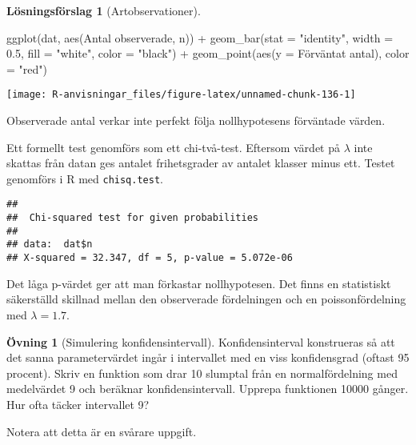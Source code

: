 \documentclass[
]{book}
\newenvironment{Shaded}{\begin{snugshade}}{\end{snugshade}}
\newcommand{\AttributeTok}[1]{\textcolor[rgb]{0.77,0.63,0.00}{#1}}
\newcommand{\FloatTok}[1]{\textcolor[rgb]{0.00,0.00,0.81}{#1}}
\newcommand{\FunctionTok}[1]{\textcolor[rgb]{0.00,0.00,0.00}{#1}}
\newcommand{\NormalTok}[1]{#1}
\newcommand{\SpecialCharTok}[1]{\textcolor[rgb]{0.00,0.00,0.00}{#1}}
\newcommand{\StringTok}[1]{\textcolor[rgb]{0.31,0.60,0.02}{#1}}
\theoremstyle{definition}
\theoremstyle{definition}
\theoremstyle{definition}
\newtheorem{exercise}{Övning}[chapter]
\theoremstyle{definition}
\newtheorem{hypothesis}{Lösningsförslag}[chapter]
\theoremstyle{remark}
\begin{document}
\begin{hypothesis}[Artobservationer]
\begin{Shaded}
\begin{Highlighting}[]
\FunctionTok{ggplot}\NormalTok{(dat, }\FunctionTok{aes}\NormalTok{(}\StringTok{\textasciigrave{}}\AttributeTok{Antal observerade}\StringTok{\textasciigrave{}}\NormalTok{, n)) }\SpecialCharTok{+}
  \FunctionTok{geom\_bar}\NormalTok{(}\AttributeTok{stat =} \StringTok{"identity"}\NormalTok{, }\AttributeTok{width =} \FloatTok{0.5}\NormalTok{, }
           \AttributeTok{fill =} \StringTok{"white"}\NormalTok{, }\AttributeTok{color =} \StringTok{"black"}\NormalTok{) }\SpecialCharTok{+}
  \FunctionTok{geom\_point}\NormalTok{(}\FunctionTok{aes}\NormalTok{(}\AttributeTok{y =} \StringTok{\textasciigrave{}}\AttributeTok{Förväntat antal}\StringTok{\textasciigrave{}}\NormalTok{), }\AttributeTok{color =} \StringTok{"red"}\NormalTok{)}
\end{Highlighting}
\end{Shaded}

\begin{center}\texttt{[image: R-anvisningar\_files/figure-latex/unnamed-chunk-136-1]} \end{center}

Observerade antal verkar inte perfekt följa nollhypotesens förväntade värden.

Ett formellt test genomförs som ett chi-två-test. Eftersom värdet på \(\lambda\) inte skattas från datan ges antalet frihetsgrader av antalet klasser minus ett. Testet genomförs i R med \texttt{chisq.test}.

\begin{Shaded}
\end{Shaded}

\begin{verbatim}
## 
##  Chi-squared test for given probabilities
## 
## data:  dat$n
## X-squared = 32.347, df = 5, p-value = 5.072e-06
\end{verbatim}

Det låga p-värdet ger att man förkastar nollhypotesen. Det finns en statistiskt säkerställd skillnad mellan den observerade fördelningen och en poissonfördelning med \(\lambda = 1.7\).
\end{hypothesis}

\begin{exercise}[Simulering konfidensintervall]
Konfidensinterval konstrueras så att det sanna parametervärdet ingår i intervallet med en viss konfidensgrad (oftast 95 procent). Skriv en funktion som drar 10 slumptal från en normalfördelning med medelvärdet 9 och beräknar konfidensintervall. Upprepa funktionen 10000 gånger. Hur ofta täcker intervallet 9?

Notera att detta är en svårare uppgift.
\end{exercise}
\end{document}
